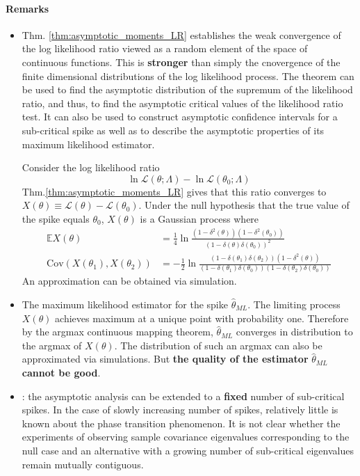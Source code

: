 \documentclass[twoside]{article}
\begin{document}
\paragraph*{Remarks}
\begin{itemize}
    \item Thm. \ref{thm:asymptotic_moments_LR} establishes the weak convergence of the log likelihood ratio viewed as a random element of the space of continuous functions. This is \textbf{stronger} than simply the cnovergence of the finite dimensional distributions of the log likelihood process. The theorem can be used to find the asymptotic distribution of the supremum of the likelihood ratio, and thus, to find the asymptotic critical values of the likelihood ratio test. It can also be used to construct asymptotic confidence intervals for a sub-critical spike as well as to describe the asymptotic properties of its maximum likelihood estimator.

    Consider the log likelihood ratio $$ \ln\mathcal{L}(\theta;\Lambda) -  \ln\mathcal{L}(\theta_0;\Lambda) $$ Thm.\ref{thm:asymptotic_moments_LR} gives that this ratio converges to $X(\theta) \equiv \mathcal{L}(\theta) - \mathcal{L}(\theta_0)$. Under the null hypothesis that the true value of the spike equals $\theta_0$, $X(\theta)$ is a Gaussian process where 
    \begin{align*}
        \mathbb{E}X(\theta) &= \frac{1}{4}\ln\frac{\left(1-\delta^2(\theta)\right)\left(1-\delta^2(\theta_0)\right)}{\left(1-\delta(\theta)\delta(\theta_0)\right)^2} \\
         \mathrm{Cov}\left(X(\theta_1),X(\theta_2)\right) &= -\frac{1}{2}\ln\frac{\left(1-\delta(\theta_1)\delta(\theta_2)\right)\left(1-\delta^2(\theta)\right)}{\left(1-\delta(\theta_1)\delta(\theta_0)\right)\left(1-\delta(\theta_2)\delta(\theta_0)\right)}
    \end{align*}
    An approximation can be obtained via simulation.
    \item The maximum likelihood estimator for the spike $\hat{\theta}_{ML}$. The limiting process $X(\theta)$ achieves maximum at a unique point with probability one. Therefore by the argmax continuous mapping theorem, $\hat{\theta}_{ML}$ converges in distribution to the argmax of $X(\theta)$. The distribution of such an argmax can also be approximated via simulations. But \textbf{the quality of the estimator} $\hat{\theta}_{ML}$ \textbf{cannot be good}.
    \item {}: the asymptotic analysis can be extended to a \textbf{fixed} number of sub-critical spikes. In the case of slowly increasing number of spikes, relatively little is known about the phase transition phenomenon. It is not clear whether the experiments of observing sample covariance eigenvalues corresponding to the null case and an alternative with a growing number of sub-critical eigenvalues remain mutually contiguous. 
    

\end{itemize}
\end{document}
